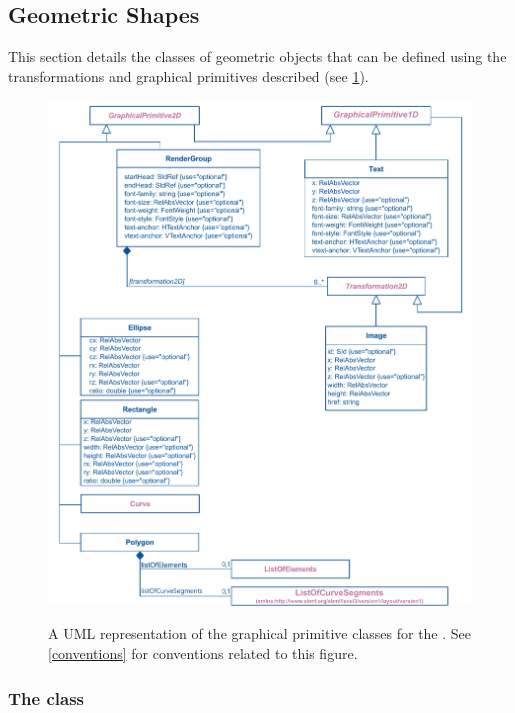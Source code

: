 \subsection{Geometric Shapes}
\label{shapes}

This section details the classes of geometric objects that can be defined using 
the transformations and graphical primitives described (see \ref{fig:group_render_uml}).

\begin{figure}[!htp]
  \centering
  \includegraphics{images/render-group-uml}\\
  \caption{A UML representation of the graphical primitive classes for the \RenderPackage.  See \ref{conventions} for conventions related to this figure. }
  \label{fig:group_render_uml}
\end{figure}
\pagebreak


\subsubsection{The  class}
\label{polygon-class}

